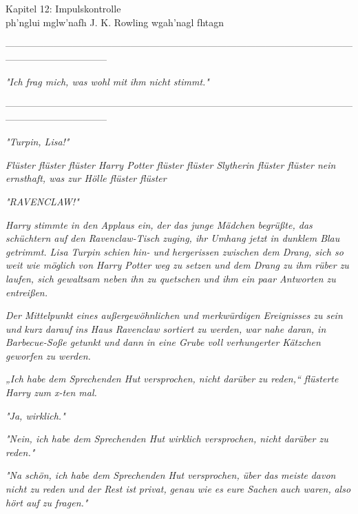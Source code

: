 

\hypertarget{impulskontrolle}{%

Kapitel 12: Impulskontrolle\\

\hfill\break ph'nglui mglw'nafh J. K. Rowling wgah'nagl fhtagn

--------------------------------------------------------------------------------------------------------------------------------------------

\hfill\break

\emph{\emph{"Ich frag mich, was wohl mit}} \emph{ihm} \emph{\emph{nicht stimmt."}}

\hfill\break

--------------------------------------------------------------------------------------------------------------------------------------------

\hfill\break \emph{"Turpin, Lisa!"}

\emph{Flüster flüster flüster Harry Potter flüster flüster Slytherin flüster flüster nein ernsthaft, was zur Hölle flüster flüster}

\emph{"RAVENCLAW!"}

\emph{Harry stimmte in den Applaus ein, der das junge Mädchen begrüßte, das schüchtern auf den Ravenclaw-Tisch zuging, ihr Umhang jetzt in dunklem Blau getrimmt. Lisa Turpin schien hin- und hergerissen zwischen dem Drang, sich so weit wie möglich von Harry Potter weg zu setzen und dem Drang zu ihm rüber zu laufen, sich gewaltsam neben ihn zu quetschen und ihm ein paar Antworten zu entreißen.}

\emph{Der Mittelpunkt eines außergewöhnlichen und merkwürdigen Ereignisses zu sein und} \emph{kurz darauf} \emph{ins Haus Ravenclaw sortiert zu werden, war nahe daran, in Barbecue-Soße getunkt und} \emph{dann} \emph{in eine Grube voll verhungerter Kätzchen geworfen zu werden.}

\emph{„Ich habe dem Sprechenden Hut versprochen, nicht darüber zu reden,“ flüsterte Harry zum x-ten mal.}

\emph{"Ja, wirklich."}

\emph{"Nein, ich habe dem Sprechenden Hut wirklich versprochen, nicht darüber zu reden."}

\emph{"Na schön, ich habe dem Sprechenden Hut versprochen, über das} \emph{\emph{meiste}} \emph{davon nicht zu reden und der Rest ist} \emph{\emph{privat,}} \emph{genau wie es} \emph{\emph{eure Sachen auch waren,}} \emph{also} \emph{\emph{hört auf zu fragen.}"}

}
